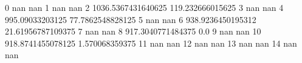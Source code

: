 0 nan nan
1 nan nan
2 1036.5367431640625 119.232666015625
3 nan nan
4 995.09033203125 77.7862548828125
5 nan nan
6 938.9236450195312 21.61956787109375
7 nan nan
8 917.3040771484375 0.0
9 nan nan
10 918.8741455078125 1.570068359375
11 nan nan
12 nan nan
13 nan nan
14 nan nan
